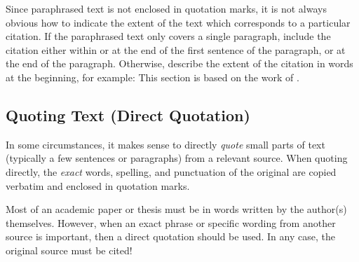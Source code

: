 Since paraphrased text is not enclosed in quotation marks, it is not
always obvious how to indicate the extent of the text which
corresponds to a particular citation. If the paraphrased text only
covers a single paragraph, include the citation either within or at
the end of the first sentence of the paragraph, or at the end of the
paragraph. Otherwise, describe the extent of the citation in words at
the beginning, for example: This section is based on the work of
\textcite{InfoSkyIVS}.





\subsection{Quoting Text (Direct Quotation)}

In some circumstances, it makes sense to directly \emph{quote} small
parts of text (typically a few sentences or paragraphs) from a
relevant source. When quoting directly, the \emph{exact} words,
spelling, and punctuation of the original are copied verbatim and
enclosed in quotation marks.

Most of an academic paper or thesis must be in words written by the
author(s) themselves. However, when an exact phrase or specific
wording from another source is important, then a direct quotation
should be used. In any case, the original source must be cited!

